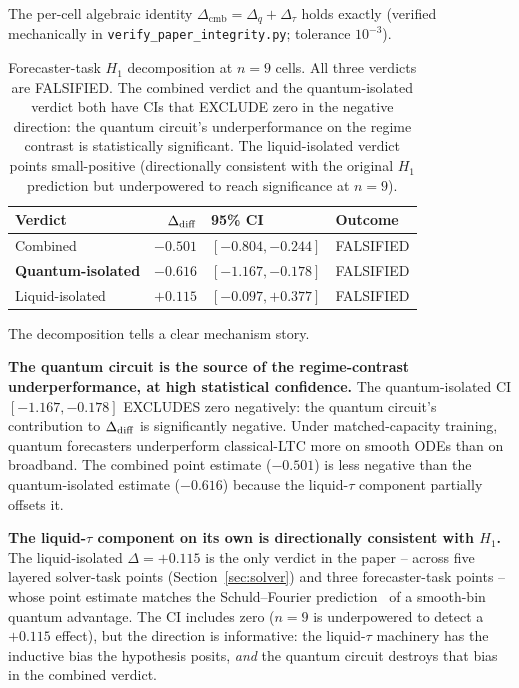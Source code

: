 The per-cell algebraic identity $\Delta_\mathrm{cmb} =
\Delta_q + \Delta_\tau$ holds exactly
(verified mechanically in
\texttt{verify\_paper\_integrity.py}; tolerance $10^{-3}$).

\begin{table}[h]
\centering
\caption{Forecaster-task $H_1$ decomposition at $n=9$ cells. All
three verdicts are FALSIFIED. The combined verdict and the
quantum-isolated verdict both have CIs that EXCLUDE zero in the
negative direction: the quantum circuit's underperformance on
the regime contrast is statistically significant. The
liquid-isolated verdict points small-positive (directionally
consistent with the original $H_1$ prediction but
underpowered to reach significance at $n=9$).}
\label{tab:forecaster-decomp}
\small
\begin{tabular}{lrll}
\toprule
Verdict & $\Delta_{\mathrm{diff}}$ & 95\% CI & Outcome \\
\midrule
Combined         & $-0.501$ & $[-0.804, -0.244]$ & FALSIFIED \\
\textbf{Quantum-isolated} & $\mathbf{-0.616}$ & $\mathbf{[-1.167, -0.178]}$ &
  FALSIFIED \\
Liquid-isolated  & $+0.115$ & $[-0.097, +0.377]$ & FALSIFIED \\
\bottomrule
\end{tabular}
\end{table}

The decomposition tells a clear mechanism story.

\textbf{The quantum circuit is the source of the regime-contrast
underperformance, at high statistical confidence.} The
quantum-isolated CI $[-1.167, -0.178]$ EXCLUDES zero negatively:
the quantum circuit's contribution to $\Delta_{\mathrm{diff}}$ is significantly
negative. Under matched-capacity training, quantum forecasters
underperform classical-LTC more on smooth ODEs than on broadband.
The combined point estimate ($-0.501$) is less negative than the
quantum-isolated estimate ($-0.616$) because the liquid-$\tau$
component partially offsets it.

\textbf{The liquid-$\tau$ component on its own is directionally
consistent with $H_1$.} The liquid-isolated $\Delta = +0.115$ is
the only verdict in the paper -- across five layered solver-task
points (Section~\ref{sec:solver}) and three forecaster-task
points -- whose point estimate matches the Schuld--Fourier
prediction~\cite{schuld2021effect,schuld2022right} of a smooth-bin
quantum advantage. The CI includes zero ($n=9$ is underpowered to
detect a $+0.115$ effect), but the direction is informative: the
liquid-$\tau$ machinery has the inductive bias the hypothesis
posits, \emph{and} the quantum circuit destroys that bias in the
combined verdict.

